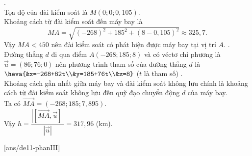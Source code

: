 \begin{ex}
{\begin{itemchoice}
			.\\
			Tọa độ của đài kiểm soát là $M(0;0;0{,}105)$.\\
			Khoảng cách từ đài kiểm soát đến máy bay là
			$$
			MA=\sqrt{(-268)^2+185^2+(8-0{,}105)^2}\approx 325{,}7.
			$$
			Vậy $MA<450$ nên đài kiểm soát có phát hiện được máy bay tại vị trí $A$.
			.\\
			Đường thẳng $d$ đi qua điểm $A(-268;185;8)$ và có véctơ chỉ phương là $\overrightarrow{u}=(86;76;0)$ nên phương trình tham số của đường thẳng $d$ là $\heva{&x=-268+82t\\&y=185+76t\\&z=8}$ ($t$ là tham số)
			.\\
			Khoảng cách gần nhất giữa máy bay và đài kiểm soát không lưu chính là khoảng cách từ đài kiểm soát không lưu đến quỹ đạo chuyển động $d$ của máy bay.\\
			Ta có $\overrightarrow{MA}=(-268;185;7{,}895)$.\\
			Vậy $h=\dfrac{\left|\left[\overrightarrow{MA},\overrightarrow{u}\right]\right|}{|\overrightarrow{u}|}=317{,}96$ (km).
		\end{itemchoice}
	}
\end{ex}
\TNSA
{}[ans/de11-phanIII]
